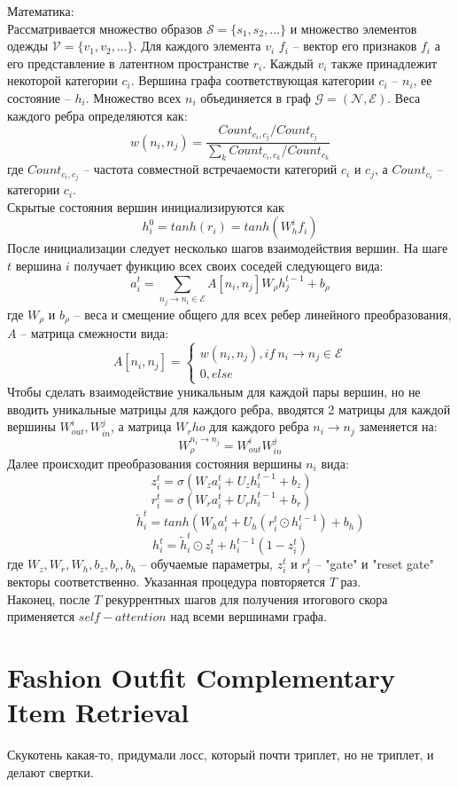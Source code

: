 \documentclass[a4paper,12pt]{article}
\begin{document}
Математика:\\
Рассматривается множество образов $\mathcal{S} =\{s_1,s_2,\dots\}$ и множество элементов одежды $\mathcal{V} = \{v_1,v_2,\dots\}$. Для каждого элемента $v_i$ $f_i$ -- вектор его признаков $f_i$ а его представление в латентном пространстве $r_i$. Каждый $v_i$ также принадлежит некоторой категории $c_i$. Вершина графа соответствующая категории $c_i$ -- $n_i$, ее состояние -- $h_i$. Множество всех $n_i$ объединяется в граф $\mathcal{G} = (\mathcal{N}, \mathcal{E})$. Веса каждого ребра определяются как:
$$w(n_i, n_j) = \frac{Count_{c_i,c_j}/Count_{c_j}}{\sum_k Count_{c_i,c_k}/Count_{c_k}}$$
где $Count_{c_i,c_j}$ -- частота совместной встречаемости категорий $c_i$ и $c_j$, а $Count_{c_i}$ -- категории $c_i$.\\
Скрытые состояния вершин инициализируются как 
$$h_i^0 = tanh(r_i) = tanh(W_h^i f_i)$$
После инициализации следует несколько шагов взаимодействия вершин. На шаге $t$ вершина $i$ получает функцию всех своих соседей следующего вида:
$$a_i^t = \sum\limits_{n_j\to n_i \in \mathcal{E}} A[n_i, n_j]W_\rho h_j^{t-1} + b_\rho$$
где $W_\rho$ и $b_\rho$ -- веса и смещение общего для всех ребер линейного преобразования, $A$ -- матрица смежности вида:
$$A[n_i, n_j] = \begin{cases}
	w(n_i, n_j), if~n_i \to n_j \in \mathcal{E}\\
	0, else
\end{cases}$$
Чтобы сделать взаимодействие уникальным для каждой пары вершин, но не вводить уникальные матрицы для каждого ребра, вводятся 2 матрицы для каждой вершины $W_{out}^i, W_{in}^j$, а матрица $W_rho$ для каждого ребра $n_i\to n_j$ заменяется на:
$$W_\rho^{n_i\to n_j} = W_{out}^i W_{in}^j$$
Далее происходит преобразования состояния вершины $n_i$ вида:
$$~z_i^t = \sigma(W_za_i^t + U_zh_i^{t-1} + b_z)$$
$$~r_i^t = \sigma(W_ra_i^t + U_rh_i^{t-1} + b_r)$$
$$~~~~~~~~~~~~~~~\tilde{h}_i^t =tanh(W_ha_i^t + U_h(r_i^t \odot h_i^{t-1}) + b_h)$$
$$h_i^t = \tilde{h}_i^t\odot z_i^t + h_i^{t-1}(1-z_i^t)$$
где $W_z, W_r, W_h, b_z, b_r, b_h$ -- обучаемые параметры, $z_i^t$ и $r_i^t$ -- "gate" и "reset gate" векторы соответственно. Указанная процедура повторяется $T$ раз.\\
Наконец, после $T$ рекуррентных шагов для получения итогового скора применяется $self-attention$ над всеми вершинами графа.




\section{Fashion Outfit Complementary Item Retrieval}
Скукотень какая-то, придумали лосс, который почти триплет, но не триплет, и делают свертки.
\end{document}
